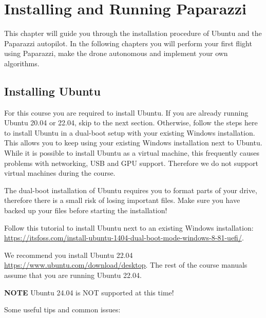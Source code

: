 \chapter{Installing and Running Paparazzi}
This chapter will guide you through the installation procedure of Ubuntu and the Paparazzi autopilot.
In the following chapters you will perform your first flight using Paparazzi, make the drone autonomous and implement your own algorithms.

\section{Installing Ubuntu}
For this course you are required to install Ubuntu.
If you are already running Ubuntu 20.04 or 22.04, skip to the next section.
Otherwise, follow the steps here to install Ubuntu in a dual-boot setup with your existing Windows installation.
This allows you to keep using your existing Windows installation next to Ubuntu.
While it is possible to install Ubuntu as a virtual machine, this frequently causes problems with networking, USB and GPU support. Therefore we do not support virtual machines during the course.

The dual-boot installation of Ubuntu requires you to format parts of your drive, therefore there is a small risk of losing important files.
Make sure you have backed up your files before starting the installation!

Follow this tutorial to install Ubuntu next to an existing Windows installation: \url{https://itsfoss.com/install-ubuntu-1404-dual-boot-mode-windows-8-81-uefi/}. 

We recommend you install Ubuntu 22.04 \url{https://www.ubuntu.com/download/desktop}. The rest of the course manuals assume that you are running Ubuntu 22.04. 

\textbf{NOTE} Ubuntu 24.04 is NOT supported at this time!

Some useful tips and common issues:

